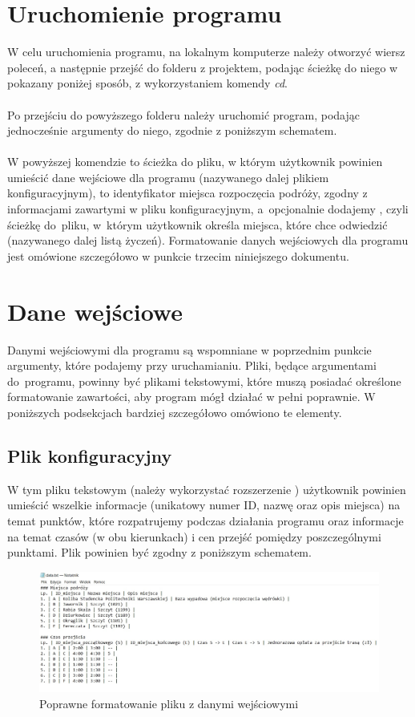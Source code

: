 \documentclass[12pt,a4paper]{article}
\begin{document}
\section{Uruchomienie programu}
W celu uruchomienia programu, na lokalnym komputerze należy otworzyć wiersz poleceń, a następnie przejść do folderu z projektem, podając ścieżkę do niego w pokazany poniżej sposób, z wykorzystaniem komendy \textsl{cd}.\smallskip\\
\smallskip
{}\\
\indent Po przejściu do powyższego folderu należy uruchomić program, podając jednocześnie argumenty do niego, zgodnie z poniższym schematem.\smallskip\\
{\scriptsize{}\smallskip\\}
\indent W powyższej komendzie  to ścieżka do pliku, w którym użytkownik powinien umieścić dane wejściowe dla programu (nazywanego dalej plikiem konfiguracyjnym),  to identyfikator miejsca rozpoczęcia podróży, zgodny z informacjami zawartymi w pliku konfiguracyjnym, a~opcjonalnie dodajemy , czyli ścieżkę do~pliku, w~którym użytkownik określa miejsca, które chce odwiedzić (nazywanego dalej listą życzeń). Formatowanie danych wejściowych dla programu jest omówione szczegółowo w punkcie trzecim niniejszego dokumentu.
\section{Dane wejściowe}
Danymi wejściowymi dla programu są wspomniane w poprzednim punkcie argumenty, które podajemy przy uruchamianiu. Pliki, będące argumentami do~programu, powinny być plikami tekstowymi, które muszą posiadać określone formatowanie zawartości, aby program mógł działać w pełni poprawnie. W poniższych podsekcjach bardziej szczegółowo omówiono te elementy.\\
\newpage
\subsection{Plik konfiguracyjny}
W tym pliku tekstowym (należy wykorzystać rozszerzenie ) użytkownik powinien umieścić wszelkie informacje (unikatowy numer ID, nazwę oraz opis miejsca) na temat punktów, które rozpatrujemy podczas działania programu oraz informacje na temat czasów (w obu kierunkach) i cen przejść pomiędzy poszczególnymi punktami. Plik powinien być zgodny z poniższym schematem.
\begin{figure}[h!]
\includegraphics[scale=0.5]{data.jpg}
\caption{Poprawne formatowanie pliku z danymi wejściowymi}
\end{figure}
\end{document}
